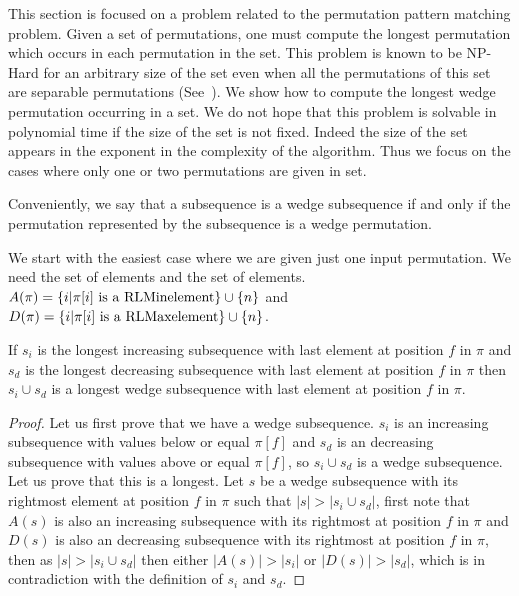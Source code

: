 \documentclass[a4paper]{llncs}
\newcommand{\RLMin}{\text{RLMin}}
\newcommand{\RLMax}{\text{RLMax}}
\begin{document}
This section is focused on a problem related to the permutation pattern matching problem.
Given a set of permutations, one must compute the longest permutation
which occurs in each permutation in the set.
This problem is known to be NP-Hard for an arbitrary size of the set even
when all the permutations of this set are separable permutations (See~\cite{2007math......2109B}).
We show how to compute the longest wedge permutation
occurring in a set.
We do not hope that this problem is solvable in polynomial time
if the size of the set is not fixed.
Indeed the size of the set appears in the exponent
in the complexity of the algorithm.
Thus we focus on the cases where only one or two permutations are given in set.

Conveniently, we say that a subsequence is
a wedge subsequence if and only if the permutation represented by the subsequence
is a wedge permutation.

We start with the easiest case where we are given just one input permutation.
We need the set of \RLMax elements and the set of \RLMin elements.
$A(\pi) = \{i | \text{$\pi[i]$ is a \RLMin element} \} \cup \{n\}$ and
$D(\pi) = \{i | \text{$\pi[i]$ is a \RLMax element} \} \cup \{n\}$.\\


\begin{proposition}
\label{proposition:longestIncreasingSubsequence}
If $s_i$ is the longest increasing subsequence with last element at position $f$ in $\pi$
and $s_d$ is the longest decreasing subsequence with last element at position $f$ in $\pi$
then $s_i \cup s_d$ is a longest wedge subsequence with last element at position $f$ in $\pi$.
\end{proposition}

\begin{proof}
Let us first prove that we have a wedge subsequence.
$s_i$ is an increasing subsequence with values below or equal $\pi[f]$ and
$s_d$ is an decreasing subsequence with values above or equal $\pi[f]$,
so $s_i \cup s_d$ is a wedge subsequence.
Let us prove that this is a longest.
Let $s$ be a wedge subsequence with its rightmost element at position $f$ in $\pi$ such
that $|s|>|s_i \cup s_d|$,
first note that $A(s)$ is also an increasing subsequence with its rightmost  at position $f$ in $\pi$
and $D(s)$ is also an decreasing subsequence with its rightmost  at position $f$ in $\pi$,
then as $|s|>|s_i \cup s_d|$ then either $|A(s)| > |s_i|$ or $|D(s)| > |s_d|$,
which is in contradiction with the definition of $s_i$ and $s_d$.
\end{proof}
\end{document}

